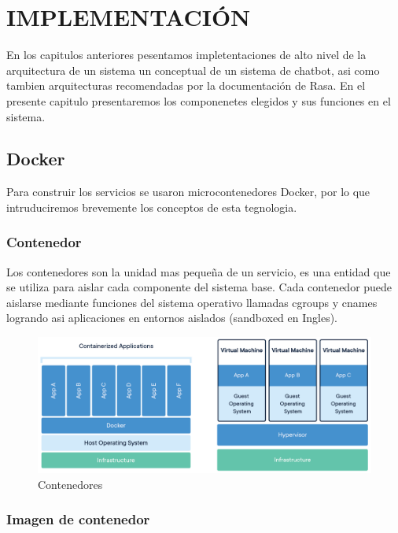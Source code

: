 \chapter[IMPLEMENTACION]{IMPLEMENTACIÓN}
En los capitulos anteriores pesentamos impletentaciones de alto nivel de la arquitectura de un sistema un 
conceptual de un sistema de chatbot, asi como tambien arquitecturas recomendadas por la documentación de Rasa. En el presente capitulo presentaremos los componenetes elegidos y sus funciones en el sistema.
  
\section{Docker}

Para construir los servicios se usaron microcontenedores Docker, por lo que intruduciremos brevemente los conceptos de esta tegnologia. 

\subsection{Contenedor}

Los contenedores son la unidad mas pequeña de un servicio, es una entidad que se utiliza para aislar cada componente del sistema base. Cada contenedor puede aislarse mediante funciones del sistema operativo llamadas cgroups y cnames logrando asi aplicaciones en entornos aislados (sandboxed en Ingles). \cite{Docker}   

\begin{figure}[ht]
    \centering
    \includegraphics[width=\textwidth]{imagenes/cap4/docker-container.png}
    \caption{Contenedores}
    \label{fig:container_diagram}
\end{figure}


\subsection{Imagen de contenedor}

